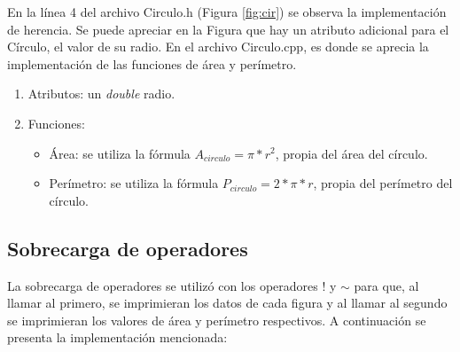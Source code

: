 \documentclass[11pt]{article}
\begin{document}
En la línea 4 del archivo Circulo.h (Figura \ref{fig:cir}) se observa la implementación de herencia. Se puede apreciar en la Figura  que hay un atributo adicional para el Círculo, el valor de su radio.
En el archivo Circulo.cpp, es donde se aprecia la implementación de las funciones de área y perímetro.

\begin{enumerate}
 \item Atributos: un \textit{double} radio.
 \item Funciones:
	\begin{itemize}
    \item Área: se utiliza la fórmula $A_{circulo}= \pi *r^{2}$, propia del área del círculo.
    \item Perímetro: se utiliza la fórmula $P_{circulo}= 2*\pi *r$, propia del perímetro del círculo.
    \end{itemize}
\end{enumerate}

\subsection{Sobrecarga de operadores}
La sobrecarga de operadores se utilizó con los operadores ! y $\sim$ para que, al llamar al primero, se imprimieran los datos de cada figura y al llamar al segundo se imprimieran los valores de área y perímetro respectivos. A continuación se presenta la implementación mencionada:
\end{document}
